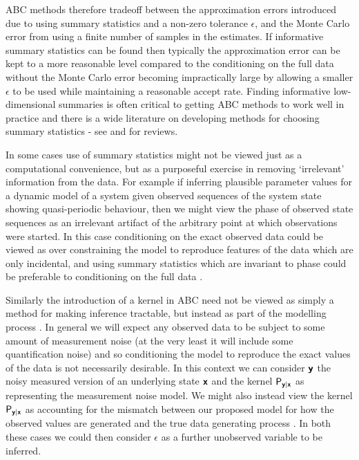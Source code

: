 \ac{ABC} methods therefore tradeoff between the approximation errors introduced due to using summary statistics and a non-zero tolerance $\epsilon$, and the Monte Carlo error from using a finite number of samples in the estimates. If informative summary statistics can be found then typically the approximation error can be kept to a more reasonable level compared to the conditioning on the full data without the Monte Carlo error becoming impractically large by allowing a smaller $\epsilon$ to be used while maintaining a reasonable accept rate. Finding informative low-dimensional summaries is often critical to getting \ac{ABC} methods to work well in practice and there is a wide literature on developing methods for choosing summary statistics - see \citep{prangle2015summary} and \citep{blum2013comparative} for reviews. 

In some cases use of summary statistics might not be viewed just as a computational convenience, but as a purposeful exercise in removing `irrelevant' information from the data. For example if inferring plausible parameter values for a dynamic model of a system given observed sequences of the system state showing quasi-periodic behaviour, then we might view the phase of observed state sequences as an irrelevant artifact of the arbitrary point at which observations were started. In this case conditioning on the exact observed data could be viewed as over constraining the model to reproduce features of the data which are only incidental, and using summary statistics which are invariant to phase could be preferable to conditioning on the full data \citep{wood2010statistical}.

Similarly the introduction of a kernel in \ac{ABC} need not be viewed as simply a method for making inference tractable, but instead as part of the modelling process \citep{wilkinson2013approximate}. In general we will expect any observed data to be subject to some amount of measurement noise (at the very least it will include some quantification noise) and so conditioning the model to reproduce the exact values of the data is not necessarily desirable. In this context we can consider $\boldsymbol{\mathsf{y}}$ the noisy measured version of an underlying state $\boldsymbol{\mathsf{x}}$ and the kernel $\mathsf{P}_{\boldsymbol{\mathsf{y}}|\boldsymbol{\mathsf{x}}}$ as representing the measurement noise model. We might also instead view the kernel $\mathsf{P}_{\boldsymbol{\mathsf{y}}|\boldsymbol{\mathsf{x}}}$ as accounting for the mismatch between our proposed model for how the observed values are generated and the true data generating process \citep{ratmann2009model,wilkinson2013approximate}. In both these cases we could then consider $\epsilon$ as a further unobserved variable to be inferred.


